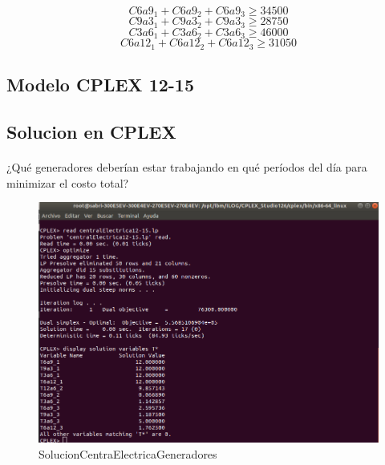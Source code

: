 \begin{equation}
C6a9_{1} + C6a9_{2} + C6a9_{3} \geq 34500
\end{equation}
\begin{equation}
C9a3_{1} + C9a3_{2} + C9a3_{3} \geq 28750
\end{equation}
\begin{equation}
C3a6_{1} + C3a6_{2} + C3a6_{3} \geq 46000
\end{equation}
\begin{equation}
C6a12_{1} + C6a12_{2} + C6a12_{3} \geq 31050
\end{equation}
\subsection{Modelo CPLEX 12-15}

\subsection{Solucion en CPLEX}

\paragraph{} ¿Qué generadores deberían estar trabajando en qué períodos del día para minimizar el costo total?
\begin{figure}[!h]
    \centering
    \includegraphics[scale=0.35]{modelos/SolutionCentralElectrica12-15Generadores.png}
    \caption{SolucionCentraElectricaGeneradores}
\end{figure}

